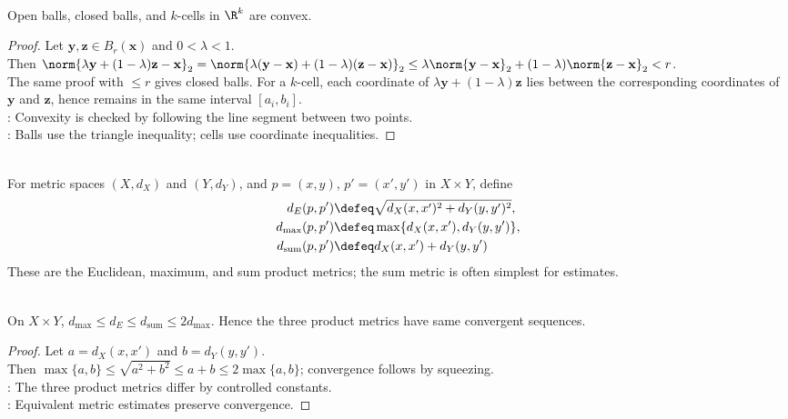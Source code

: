 \begin{proposition} \label{prop:balls-and-cells-convex} \\
Open balls, closed balls, and $k$-cells in $\R^k$ are convex.
\begin{proof}
Let $\mathbf{y},\mathbf{z}\in B_r(\mathbf{x})$ and $0<\lambda<1$.\\
Then $\norm{\lambda\mathbf{y}+(1-\lambda)\mathbf{z}-\mathbf{x}}_2 =\norm{\lambda(\mathbf{y}-\mathbf{x})+(1-\lambda)(\mathbf{z}-\mathbf{x})}_2 \leq \lambda\norm{\mathbf{y}-\mathbf{x}}_2+(1-\lambda)\norm{\mathbf{z}-\mathbf{x}}_2<r$.\\
The same proof with $\leq r$ gives closed balls. For a $k$-cell, each coordinate of $\lambda\mathbf{y}+(1-\lambda)\mathbf{z}$ lies between the corresponding coordinates of $\mathbf{y}$ and $\mathbf{z}$, hence remains in the same interval $[a_i,b_i]$.\\
: Convexity is checked by following the line segment between two points.\\
: Balls use the triangle inequality; cells use coordinate inequalities.
\end{proof}
\end{proposition}

\begin{definition} \label{def:product-metrics} \\
For metric spaces $(X,d_X)$ and $(Y,d_Y)$, and $p=(x,y)$, $p'=(x',y')$ in $X\times Y$, define
\begin{align}
d_E(p,p')&\defeq\sqrt{d_X(x,x')^2+d_Y(y,y')^2},\nonumber \\
d_{\max}(p,p')&\defeq\max\{d_X(x,x'),d_Y(y,y')\},\nonumber \\
d_{\mathrm{sum}}(p,p')&\defeq d_X(x,x')+d_Y(y,y') \nonumber
\end{align}
These are the Euclidean, maximum, and sum product metrics; the sum metric is often simplest for estimates.
\end{definition}

\begin{proposition} \label{prop:product-metric-comparison} \\
On $X\times Y$, $d_{\max}\leq d_E\leq d_{\mathrm{sum}}\leq2d_{\max}$. Hence the three product metrics have same convergent sequences.
\begin{proof}
Let $a=d_X(x,x')$ and $b=d_Y(y,y')$.\\
Then $\max\{a,b\}\leq\sqrt{a^2+b^2}\leq a+b\leq2\max\{a,b\}$; convergence follows by squeezing.\\
: The three product metrics differ by controlled constants.\\
: Equivalent metric estimates preserve convergence.
\end{proof}
\end{proposition}

